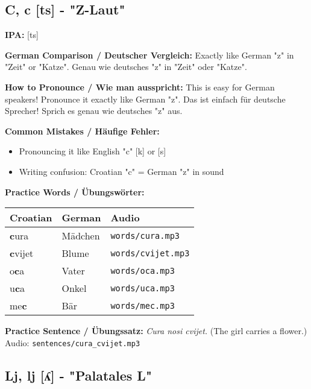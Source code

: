 \subsection{C, c [ts] - "Z-Laut"}

\begin{tcolorbox}[colback=lightyellow!30, colframe=orange, title=\textbf{C, c}]

\textbf{IPA:} [ts]

\textbf{German Comparison / Deutscher Vergleich:}
Exactly like German "z" in "Zeit" or "Katze".
Genau wie deutsches "z" in "Zeit" oder "Katze".

\textbf{How to Pronounce / Wie man ausspricht:}
This is easy for German speakers! Pronounce it exactly like German "z".
Das ist einfach für deutsche Sprecher! Sprich es genau wie deutsches "z" aus.

\textbf{Common Mistakes / Häufige Fehler:}
\begin{itemize}
    \item Pronouncing it like English "c" [k] or [s]
    \item Writing confusion: Croatian "c" = German "z" in sound
\end{itemize}

\textbf{Practice Words / Übungswörter:}
\begin{tabular}{lll}
\textbf{Croatian} & \textbf{German} & \textbf{Audio} \\
\midrule
\textbf{c}ura & Mädchen & \texttt{words/cura.mp3} \\
\textbf{c}vijet & Blume & \texttt{words/cvijet.mp3} \\
o\textbf{c}a & Vater & \texttt{words/oca.mp3} \\
u\textbf{c}a & Onkel & \texttt{words/uca.mp3} \\
me\textbf{c} & Bär & \texttt{words/mec.mp3} \\
\end{tabular}

\textbf{Practice Sentence / Übungssatz:}
\textit{Cura nosi cvijet.}
(The girl carries a flower.)
Audio: \texttt{sentences/cura\_cvijet.mp3}

\end{tcolorbox}

\subsection{Lj, lj [ʎ] - "Palatales L"}


